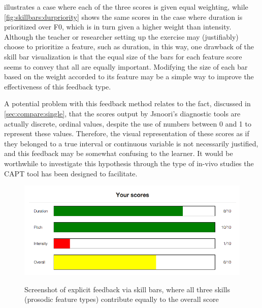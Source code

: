 		   illustrates a case where each of the three scores is given equal weighting, while \cref{fig:skillbars:durpriority} shows the same scores in the case where duration is prioritized over F0, which is in turn given a higher weight than intensity.  Although the teacher or researcher setting up the exercise may (justifiably) choose to prioritize a feature, such as duration, in this way, one drawback of the skill bar visualization is that the equal size of the bars for each feature score seems to convey that all are equally important. Modifying the size of each bar based on the weight accorded to its feature may be a simple way to improve the effectiveness of this feedback type.%
		  
		  A potential problem with this feedback method relates to the fact, discussed in \cref{sec:compare:single}, that the scores output by Jsnoori's diagnostic tools are actually discrete, ordinal values, despite the use of numbers between 0 and 1 to represent these values. Therefore, the visual representation of these scores as if they belonged to a true interval or continuous variable is not necessarily justified, and this feedback may be somewhat confusing to the learner. It would be worthwhile to investigate this hypothesis through the type of in-vivo studies the CAPT tool has been designed to facilitate. 
		
		
			\begin{figure}
			\centering
			\caption[Skill bars as explicit feedback]{Screenshot of explicit feedback via skill bars, where all three skills (prosodic feature types) contribute equally to the overall score}
			\includegraphics[width=\textwidth]{img/screenshots/skillBars-balanced-of10}
			\label{fig:skillbars:balanced}
			\end{figure}		
			
